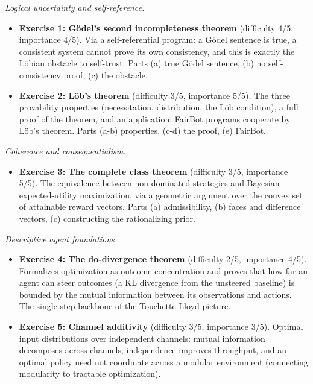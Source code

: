 \documentclass[11pt]{article}
\begin{document}
\emph{Logical uncertainty and self-reference.}

\begin{itemize}
\item
  \textbf{Exercise 1: Gödel's second incompleteness theorem} (difficulty 4/5, importance 4/5). Via a self-referential program: a Gödel sentence is true, a consistent system cannot prove its own consistency, and this is exactly the Löbian obstacle to self-trust. Parts (a) true Gödel sentence, (b) no self-consistency proof, (c) the obstacle.
\item
  \textbf{Exercise 2: Löb's theorem} (difficulty 3/5, importance 5/5). The three provability properties (necessitation, distribution, the Löb condition), a full proof of the theorem, and an application: FairBot programs cooperate by Löb's theorem. Parts (a-b) properties, (c-d) the proof, (e) FairBot.
\end{itemize}

\emph{Coherence and consequentialism.}

\begin{itemize}
\item
  \textbf{Exercise 3: The complete class theorem} (difficulty 3/5, importance 5/5). The equivalence between non-dominated strategies and Bayesian expected-utility maximization, via a geometric argument over the convex set of attainable reward vectors. Parts (a) admissibility, (b) faces and difference vectors, (c) constructing the rationalizing prior.
\end{itemize}

\emph{Descriptive agent foundations.}

\begin{itemize}
\item
  \textbf{Exercise 4: The do-divergence theorem} (difficulty 2/5, importance 4/5). Formalizes optimization as outcome concentration and proves that how far an agent can steer outcomes (a KL divergence from the unsteered baseline) is bounded by the mutual information between its observations and actions. The single-step backbone of the Touchette-Lloyd picture.
\item
  \textbf{Exercise 5: Channel additivity} (difficulty 3/5, importance 3/5). Optimal input distributions over independent channels: mutual information decomposes across channels, independence improves throughput, and an optimal policy need not coordinate across a modular environment (connecting modularity to tractable optimization).
\end{itemize}
\end{document}
